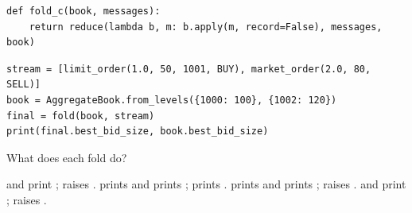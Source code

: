 \begin{question}
\begin{lstlisting}[caption={Three folds}, label=listing.foldByReduceOverApplyFolds]
def fold_c(book, messages):
    return reduce(lambda b, m: b.apply(m, record=False), messages, book)
\end{lstlisting}
\begin{lstlisting}[caption={Run once with each fold}, label=listing.foldByReduceOverApplyRun]
stream = [limit_order(1.0, 50, 1001, BUY), market_order(2.0, 80, SELL)]
book = AggregateBook.from_levels({1000: 100}, {1002: 120})
final = fold(book, stream)
print(final.best_bid_size, book.best_bid_size)
\end{lstlisting}
What does each fold do?
\begin{choices}
 \choice {} and  print ;
   raises .
 \choice {} prints  and  prints ;
   prints .
 \correctchoice {} prints  and  prints ;
   raises .
 \choice {} and  print ;
   raises .
\end{choices}
\end{question}

